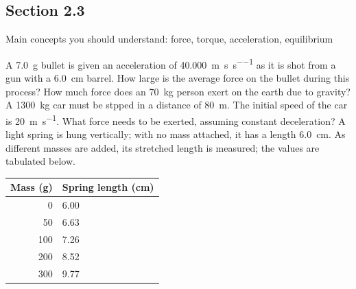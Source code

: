 \documentclass[a4paper]{exam}
\begin{document}
  \subsection*{Section 2.3}
  Main concepts you should understand: force, torque, acceleration, equilibrium
  \begin{questions}
    \question A \SI{7.0}{\gram} bullet is given an acceleration of \SI{40,000}{\metre\per\second\per\second} as it is shot from
              a gun with a \SI{6.0}{\centi\metre} barrel. How large is the average force on the bullet during this process?
    \question How much force does an \SI{70}{\kilo\gram} person exert on the earth due to gravity?
    \question A \SI{1300}{\kilo\gram} car must be stpped in a distance of \SI{80}{\metre}. The initial speed of the car
              is \SI{20}{\metre\per\second}. What force needs to be exerted, assuming constant deceleration?
    \question A light spring is hung vertically; with no mass attached, it has a length \SI{6.0}{\centi\metre}. As different
              masses are added, its stretched length is measured; the values are tabulated below.

              \begin{tabular}{r|l}
                \textbf{Mass (g)} & \textbf{Spring length (cm)}\\\hline
                0 & 6.00\\
                50 & 6.63\\
                100 & 7.26\\
                200 & 8.52\\
                300 & 9.77
              \end{tabular}

\end{questions}
\end{document}

